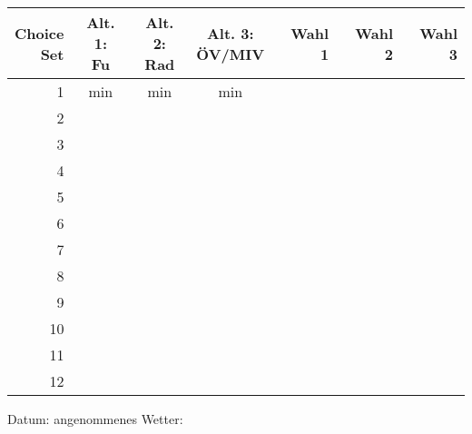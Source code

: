 \documentclass[a4paper]{foils}
\begin{document}
\begin{center}
{\small
\begin{tabular}{|r||c|c|c||r|r|r|}
\hline 
\myBox{2em}{Choice\\Set} &
  \myBox{3em}{Alt. 1:\\Fu\3} &
  \myBox{3em}{Alt. 2:\\Rad} &
  \myBox{3em}{Alt. 3:\\ \"OV/MIV} &
  Wahl 1 & Wahl 2 & Wahl 3 \\ \hline\hline
1 & \unit[30]{min} & \unit[30]{min} & \unit[30]{min}  & & & \\[0.5em] \hline
2 & & &  & & & \\[0.5em] \hline
3 & & &  & & & \\[0.5em] \hline
4 & & &  & & & \\[0.5em] \hline
5 & & &  & & & \\[0.5em] \hline
6 & & &  & & & \\[0.5em] \hline
7 & & &  & & & \\[0.5em] \hline
8 & & &  & & & \\[0.5em] \hline
9 & & &  & & & \\[0.5em] \hline
10 & & &  & & & \\[0.5em] \hline
11 & & &  & & & \\[0.5em] \hline
12 & & &  & & & \\[0.5em] \hline
\end{tabular}
}


\newpage
\vspace{1em}

Datum: \hspace{3em} angenommenes Wetter:
\vspace{1em}



\end{center}
\end{document}
